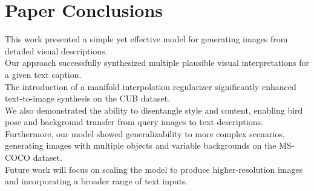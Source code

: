 \section*{Paper Conclusions}

This work presented a simple yet effective model for generating images 
from detailed visual descriptions. 
\\
Our approach successfully synthesized multiple plausible visual 
interpretations for a given text caption. 
\\
The introduction of a manifold interpolation regularizer significantly 
enhanced text-to-image synthesis on the CUB dataset. 
\\
We also demonstrated the ability to disentangle style and content, 
enabling bird pose and background transfer from query images 
to text descriptions. 
\\
Furthermore, our model showed generalizability to more complex scenarios, 
generating images with multiple objects and variable 
backgrounds on the MS-COCO dataset. 
\\
Future work will focus on scaling the model to produce higher-resolution 
images and incorporating a broader range of text inputs.
